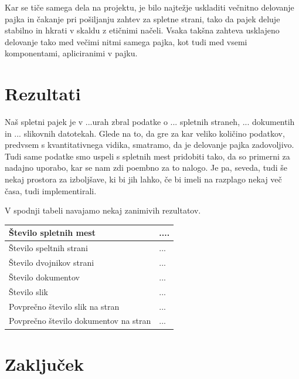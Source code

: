 \documentclass[conference]{IEEEtran}
\begin{document}
	Kar se tiče samega dela na projektu, je bilo najtežje uskladiti večnitno delovanje pajka in čakanje pri pošiljanju zahtev za spletne strani, tako da pajek deluje stabilno in hkrati v skaldu z etičnimi načeli. Vsaka takšna zahteva usklajeno delovanje tako med večimi nitmi samega pajka, kot tudi med vsemi komponentami, apliciranimi v pajku.
	
	\section{Rezultati}
	Naš spletni pajek je v ...urah zbral podatke o ... spletnih straneh, ... dokumentih in ... slikovnih datotekah. Glede na to, da gre za kar veliko količino podatkov, predvsem s kvantitativnega vidika, smatramo, da je delovanje pajka zadovoljivo. Tudi same podatke smo uspeli s spletnih mest pridobiti tako, da so primerni za nadajno uporabo, kar se nam zdi poembno za to nalogo. Je pa, seveda, tudi še nekaj prostora za izboljšave, ki bi jih lahko, če bi imeli na razplago nekaj več časa, tudi implementirali.
	
	V spodnji tabeli navajamo nekaj zanimivih rezultatov.

\begin{flushleft}
\begin{tabular}{ |l|l| } 
 \hline
 Število spletnih mest & ....  \\ 
 \hline
 Število speltnih strani & ...  \\  
 \hline
 Število dvojnikov strani & ... \\
 \hline
 Število dokumentov & ... \\
 \hline
 Število slik & ... \\
 \hline
 Povprečno število slik na stran & ... \\
 \hline
 Povprečno število dokumentov na stran & ... \\
 \hline
\end{tabular}
\end{flushleft}


	
	
	
	\section{Zaključek}
	
	
	
	
\end{document}
